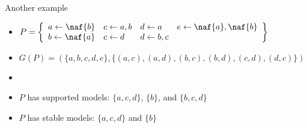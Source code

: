 \begin{frame}[c]{Another example}
  \bigskip
  \begin{itemize}
  \item<1->
  \(
  P
  =
  \left\{
    \begin{array}{llll}
        a \leftarrow \naf{b}
      & c \leftarrow a,b
      & d \leftarrow a
      & e \leftarrow\naf{a},\naf{b}
      \\
        b \leftarrow \naf{a}
      & c \leftarrow d
      & d \leftarrow b,c
      &
    \end{array}
  \right\}
  \)
  \medskip
  \item<2->
    \(
    G(P)= (\{a,b,c,d,e\},\{(a,c),(a,d),(b,c),(b,d),(c,d),(d,c)\})
    \)
  \item<3-> []
    \begin{center}
    
    \end{center}
  \item<4-> $P$ has supported models: $\{a,c,d\}$, $\{b\}$, and $\{b,c,d\}$
  \item<4-> $P$ has stable    models: $\{a,c,d\}$ and $\{b\}$
\end{itemize}
\end{frame}
